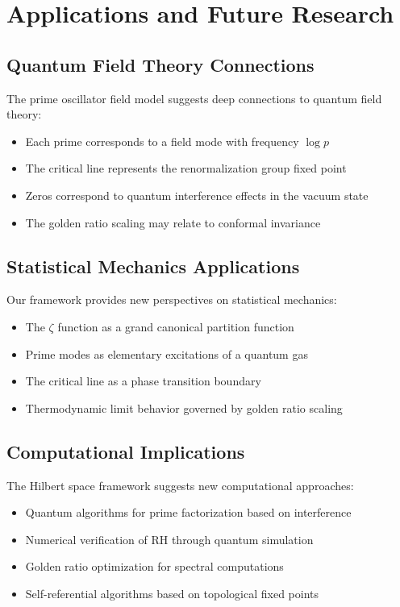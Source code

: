 \documentclass[12pt]{article}
\theoremstyle{plain}
\theoremstyle{definition}
\begin{document}
\section{Applications and Future Research}

\subsection{Quantum Field Theory Connections}

The prime oscillator field model suggests deep connections to quantum field theory:
\begin{itemize}
\item Each prime corresponds to a field mode with frequency $\log p$
\item The critical line represents the renormalization group fixed point
\item Zeros correspond to quantum interference effects in the vacuum state
\item The golden ratio scaling may relate to conformal invariance
\end{itemize}

\subsection{Statistical Mechanics Applications}

Our framework provides new perspectives on statistical mechanics:
\begin{itemize}
\item The $\zeta$ function as a grand canonical partition function
\item Prime modes as elementary excitations of a quantum gas
\item The critical line as a phase transition boundary
\item Thermodynamic limit behavior governed by golden ratio scaling
\end{itemize}

\subsection{Computational Implications}

The Hilbert space framework suggests new computational approaches:
\begin{itemize}
\item Quantum algorithms for prime factorization based on interference
\item Numerical verification of RH through quantum simulation
\item Golden ratio optimization for spectral computations
\item Self-referential algorithms based on topological fixed points
\end{itemize}
\end{document}
